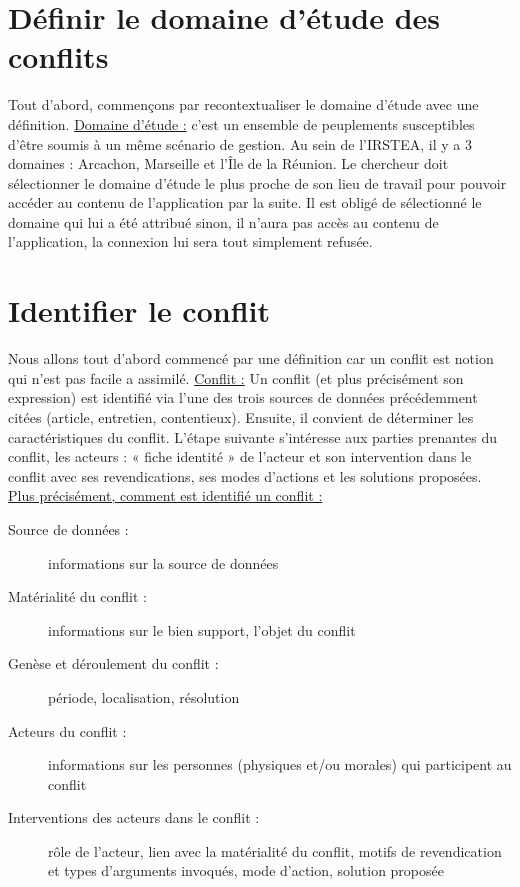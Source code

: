 \documentclass[12pt,a4paper]{article}
\begin{document}
\section{Définir le domaine d'étude des conflits}
Tout d'abord, commençons par recontextualiser le domaine d'étude avec une définition. \newline
\underline{Domaine d'étude :} c'est un ensemble de peuplements susceptibles d'être soumis à un même scénario de gestion. \newline
Au sein de l'IRSTEA, il y a 3 domaines : Arcachon, Marseille et l'Île de la Réunion. 
Le chercheur doit sélectionner le domaine d'étude le plus proche de son lieu de travail pour pouvoir accéder au contenu de l'application par la suite. Il est obligé de sélectionné le domaine qui lui a été attribué sinon, il n'aura pas accès au contenu de l'application, la connexion lui sera tout simplement refusée. 

\section{Identifier le conflit}
Nous allons tout d'abord commencé par une définition car un conflit est notion qui n'est pas facile a assimilé. \newline
\underline{Conflit :} Un conflit (et plus précisément son expression) est identifié via l’une des trois sources de données précédemment citées (article, entretien, contentieux). Ensuite, il convient de déterminer les caractéristiques du conflit. L’étape suivante s'intéresse aux parties prenantes du conflit, les acteurs : « fiche identité » de l’acteur et son intervention dans le conflit avec ses revendications, ses modes d’actions et les solutions proposées. \newline 
\underline{Plus précisément, comment est identifié un conflit :}
\begin{description}
\item[Source de données :] informations sur la source de données
\item[Matérialité du conflit :] informations sur le bien support, l’objet du conflit
\item[Genèse et déroulement du conflit :] période, localisation, résolution 
\item[Acteurs du conflit :] informations sur les personnes (physiques et/ou morales) qui participent au conflit
\item[Interventions des acteurs dans le conflit :] rôle de l’acteur, lien avec la matérialité du conflit, motifs de revendication et types d’arguments invoqués, mode d’action, solution proposée \newline \newline
\end{description}
\end{document}
